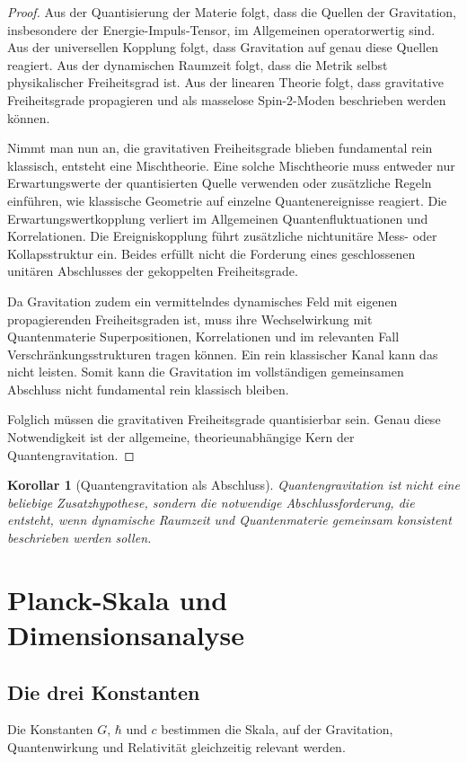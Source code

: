 \documentclass[11pt,a4paper]{book}
\newtheorem{korollar}{Korollar}[chapter]
\theoremstyle{remark}
\begin{document}
\begin{proof}
Aus der Quantisierung der Materie folgt, dass die Quellen der Gravitation, insbesondere der Energie-Impuls-Tensor, im Allgemeinen operatorwertig sind. Aus der universellen Kopplung folgt, dass Gravitation auf genau diese Quellen reagiert. Aus der dynamischen Raumzeit folgt, dass die Metrik selbst physikalischer Freiheitsgrad ist. Aus der linearen Theorie folgt, dass gravitative Freiheitsgrade propagieren und als masselose Spin-2-Moden beschrieben werden können.

Nimmt man nun an, die gravitativen Freiheitsgrade blieben fundamental rein klassisch, entsteht eine Mischtheorie. Eine solche Mischtheorie muss entweder nur Erwartungswerte der quantisierten Quelle verwenden oder zusätzliche Regeln einführen, wie klassische Geometrie auf einzelne Quantenereignisse reagiert. Die Erwartungswertkopplung verliert im Allgemeinen Quantenfluktuationen und Korrelationen. Die Ereigniskopplung führt zusätzliche nichtunitäre Mess- oder Kollapsstruktur ein. Beides erfüllt nicht die Forderung eines geschlossenen unitären Abschlusses der gekoppelten Freiheitsgrade.

Da Gravitation zudem ein vermittelndes dynamisches Feld mit eigenen propagierenden Freiheitsgraden ist, muss ihre Wechselwirkung mit Quantenmaterie Superpositionen, Korrelationen und im relevanten Fall Verschränkungsstrukturen tragen können. Ein rein klassischer Kanal kann das nicht leisten. Somit kann die Gravitation im vollständigen gemeinsamen Abschluss nicht fundamental rein klassisch bleiben.

Folglich müssen die gravitativen Freiheitsgrade quantisierbar sein. Genau diese Notwendigkeit ist der allgemeine, theorieunabhängige Kern der Quantengravitation.
\end{proof}

\begin{korollar}[Quantengravitation als Abschluss]
Quantengravitation ist nicht eine beliebige Zusatzhypothese, sondern die notwendige Abschlussforderung, die entsteht, wenn dynamische Raumzeit und Quantenmaterie gemeinsam konsistent beschrieben werden sollen.
\end{korollar}

\chapter{Planck-Skala und Dimensionsanalyse}
\section{Die drei Konstanten}
Die Konstanten $G$, $\hbar$ und $c$ bestimmen die Skala, auf der Gravitation, Quantenwirkung und Relativität gleichzeitig relevant werden.
\end{document}
